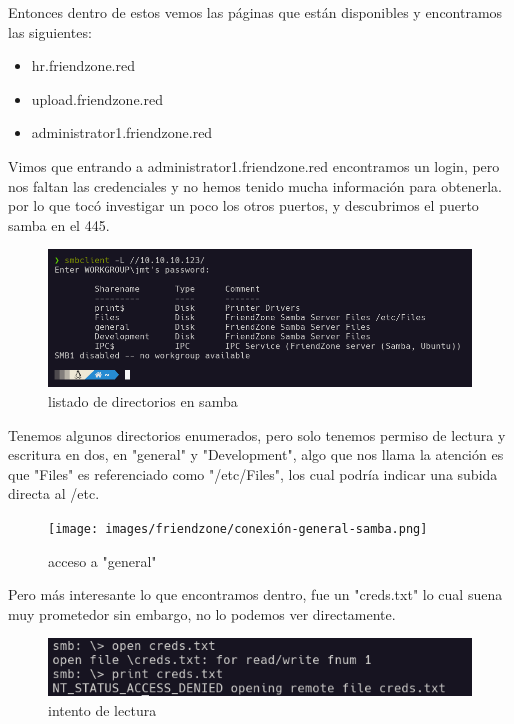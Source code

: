 \documentclass{article}
\begin{document}
Entonces dentro de estos vemos las páginas que están disponibles y encontramos las siguientes: 

\begin{itemize}
	\item hr.friendzone.red
	\item upload.friendzone.red
	\item administrator1.friendzone.red
\end{itemize}

Vimos que entrando a administrator1.friendzone.red encontramos un login, pero nos faltan las credenciales y no hemos tenido mucha información para obtenerla.
por lo que tocó investigar un poco los otros puertos, y descubrimos el puerto samba en el 445.

\begin{figure}[H]
	\center
	\includegraphics[width=\textwidth]{images/friendzone/samba-escaneo.png}
	\caption{listado de directorios en samba}
\end{figure}

Tenemos algunos directorios enumerados, pero solo tenemos permiso de lectura y escritura en dos, en "general" y "Development", algo que nos llama la atención es que "Files" es referenciado como "/etc/Files", los cual podría indicar una subida directa al /etc.


\begin{figure}[H]
	\center
	\texttt{[image: images/friendzone/conexión-general-samba.png]}
	\caption{acceso a "general"}
\end{figure}

Pero más interesante lo que encontramos dentro, fue un "creds.txt" lo cual suena muy prometedor sin embargo, no lo podemos ver directamente.

\begin{figure}[H]
	\center
	\includegraphics[width=\textwidth]{images/friendzone/intento-lectura-samba.png}
	\caption{intento de lectura}
\end{figure}
\end{document}
